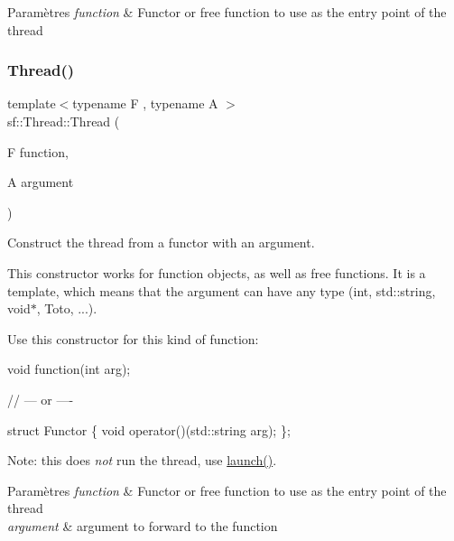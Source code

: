 \begin{DoxyParams}{Paramètres}
{\em function} & Functor or free function to use as the entry point of the thread \\
\hline
\end{DoxyParams}
\mbox{\label{classsf_1_1Thread_a719b2cc067d92d52c35064a49d850a53}} 
\subsubsection{\texorpdfstring{Thread()}{Thread()}\hspace{0.1cm}{\footnotesize\ttfamily [2/3]}}
{\footnotesize\ttfamily template$<$typename F , typename A $>$ \\
sf\+::\+Thread\+::\+Thread (\begin{DoxyParamCaption}\item[{F}]{function,  }\item[{A}]{argument }\end{DoxyParamCaption})}



Construct the thread from a functor with an argument. 

This constructor works for function objects, as well as free functions. It is a template, which means that the argument can have any type (int, std\+::string, void$\ast$, Toto, ...).

Use this constructor for this kind of function\+: 
\begin{DoxyCode}
\textcolor{keywordtype}{void} \textcolor{keyword}{function}(\textcolor{keywordtype}{int} arg);

\textcolor{comment}{// --- or ----}

\textcolor{keyword}{struct }Functor
\{
    \textcolor{keywordtype}{void} operator()(std::string arg);
\};
\end{DoxyCode}
 Note\+: this does {\itshape not} run the thread, use \hyperlink{classsf_1_1Thread_a74f75a9e86e1eb47479496314048b5f6}{launch()}.


\begin{DoxyParams}{Paramètres}
{\em function} & Functor or free function to use as the entry point of the thread \\
\hline
{\em argument} & argument to forward to the function \\
\hline
\end{DoxyParams}
\mbox{\label{classsf_1_1Thread_aa9f473c8cbb078900c62b1fd14a83a34}} 
